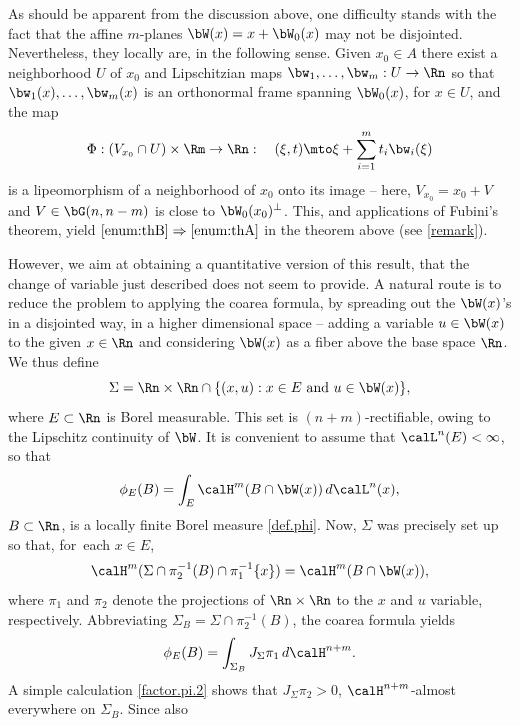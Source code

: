 As should be apparent from the discussion above, one difficulty stands with the fact that the affine $m$-planes $\bW(x) = x + \bW_0(x)$ may not be disjointed.
Nevertheless, they locally are, in the following sense.
Given $x_0 \in A$ there exist a neighborhood $U$ of $x_0$ and Lipschitzian maps $\bw_1,\ldots,\bw_m: U \to \Rn$ so that $\bw_1(x),\ldots,\bw_m(x)$ is an orthonormal frame spanning $\bW_0(x)$, for $x \in U$, and the map
\[
\Phi: (V_{x_0} \cap U) \times \Rm \to \Rn:\quad (\xi,t) \mto \xi + \sum_{i=1}^m t_i \bw_i(\xi)
\]
is a lipeomorphism of a neighborhood of $x_0$ onto its image -- here, $V_{x_0} = x_0 + V$ and $V \in \bG(n,n-m)$ is close to $\bW_0(x_0)^\perp$.
This, and applications of Fubini's theorem, yield $\eqref{enum:thB} \Rightarrow \eqref{enum:thA}$ in the theorem above (see \ref{remark}).
\par
However, we aim at obtaining a quantitative version of this result, that the change of variable just described does not seem to provide.
A natural route is to reduce the problem to applying the coarea formula, by spreading out the $\bW(x)$'s in a disjointed way, in a higher dimensional space -- \ie adding a variable $u \in \bW(x)$ to the given $x \in \Rn$ and considering $\bW(x)$ as a fiber above the base space $\Rn$.
We thus define
\begin{equation*}
\Sigma = \Rn \times \Rn \cap \{ (x,u): x \in E \text{ and } u \in \bW(x) \},
\end{equation*}
where $E \subset \Rn$ is Borel measurable.
This set is $(n+m)$-rectifiable, owing to the Lipschitz continuity of $\bW$.
It is convenient to assume that $\calL^n(E) < \infty$, so that
\begin{equation}
\label{eq.01}
\phi_E(B) = \int_E \calH^m(B \cap \bW(x)) \,d\calL^n(x),
\end{equation}
$B \subset \Rn$, is a locally finite Borel measure \ref{def.phi}.
Now, $\Sigma$ was precisely set up so that, for~each $x \in E$,
\begin{equation*}
\calH^m(\Sigma \cap \pi_2^{-1}(B) \cap \pi_1^{-1}\{x\}) = \calH^m(B \cap \bW(x)),
\end{equation*}
where $\pi_1$ and $\pi_2$ denote the projections of $\Rn \times \Rn$ to the $x$ and $u$ variable, respectively.
Abbreviating $\Sigma_B = \Sigma \cap \pi_2^{-1}(B)$, the coarea formula yields
\begin{equation}
\label{eq.02}
\phi_E(B) = \int_{\Sigma_B} J_\Sigma \pi_1 \,d\calH^{n+m}.
\end{equation}
A simple calculation \ref{factor.pi.2} shows that $J_\Sigma \pi_2 > 0$, $\calH^{n+m}$-almost everywhere on $\Sigma_B$. Since also
